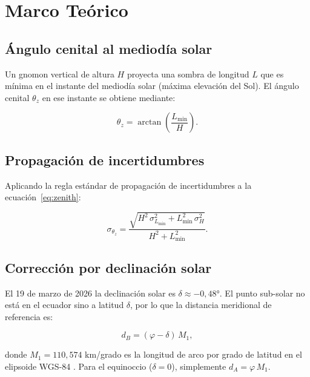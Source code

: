 \documentclass[stu,12pt,floatsintext]{apa7}
\begin{document}
\section{Marco Teórico}

\subsection{Ángulo cenital al mediodía solar}

Un gnomon vertical de altura $H$ proyecta una sombra de longitud $L$ que es mínima en el
instante del mediodía solar (máxima elevación del Sol). El ángulo cenital $\theta_z$ en ese
instante se obtiene mediante:

\begin{equation}
    \theta_z = \arctan\!\left(\frac{L_{\min}}{H}\right).
    \label{eq:zenith}
\end{equation}

\subsection{Propagación de incertidumbres}

Aplicando la regla estándar de propagación de incertidumbres \parencite{jcgm2008gum} a la
ecuación~\eqref{eq:zenith}:

\begin{equation}
    \sigma_{\theta_z} = \frac{\sqrt{H^2\,\sigma_{L_{\min}}^2 + L_{\min}^2\,\sigma_H^2}}
                             {H^2 + L_{\min}^2}.
    \label{eq:prop_error}
\end{equation}

\subsection{Corrección por declinación solar}

El 19 de marzo de 2026 la declinación solar es $\delta \approx -0{,}48°$. El punto
sub-solar no está en el ecuador sino a latitud $\delta$, por lo que la distancia meridional
de referencia es:

\begin{equation}
    d_B = (\varphi - \delta)\,M_1,
    \label{eq:dist_corr}
\end{equation}

donde $M_1 = 110{,}574$ km/grado es la longitud de arco por grado de latitud en el
elipsoide WGS-84 \parencite{nga_wgs84}. Para el equinoccio ($\delta = 0$), simplemente
$d_A = \varphi\,M_1$.
\end{document}
